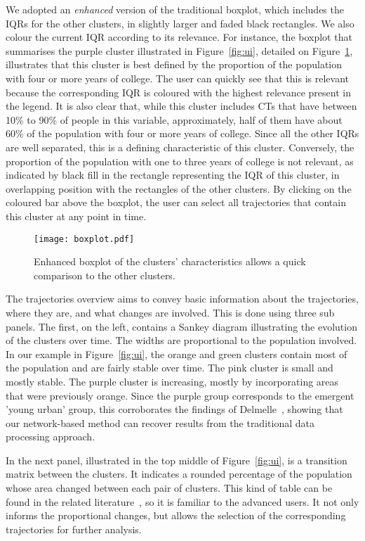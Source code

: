 We adopted an \emph{enhanced} version of the traditional boxplot, which includes
the IQRs for the other clusters, in slightly larger and faded black rectangles.
We also colour the current IQR according to its relevance.  For instance, the
boxplot that summarises the purple cluster illustrated in Figure~\ref{fig:ui},
detailed on Figure~\ref{fig:boxplot}, illustrates that this cluster is best
defined by the proportion of the population with four or more years of college.
The user can quickly see that this is relevant because the corresponding IQR is
coloured with the highest relevance present in the legend. It is also clear
that, while this cluster includes CTs that have between 10\% to 90\% of people
in this variable, approximately, half of them have about 60\% of the population
with four or more years of college. Since all the other IQRs are well separated,
this is a defining characteristic of this cluster. Conversely, the proportion of
the population with one to three years of college is not relevant, as indicated
by black fill in the rectangle representing the IQR of this cluster, in
overlapping position with the rectangles of the other clusters. By clicking on
the coloured bar above the boxplot, the user can select all trajectories that
contain this cluster at any point in time.

\begin{figure}
    \centering 
    \texttt{[image: boxplot.pdf]}
    \caption{Enhanced boxplot of the clusters' characteristics allows a quick
    comparison to the other clusters.\label{fig:boxplot}}
\end{figure}


The trajectories overview aims to convey basic information about the
trajectories, where they are, and what changes are involved. This is done using
three sub panels. The first, on the left, contains a Sankey diagram illustrating
the evolution of the clusters over time. The widths are proportional to the
population involved. In our example in Figure~\ref{fig:ui}, the orange and green
clusters contain most of the population and are fairly stable over time. The
pink cluster is small and mostly stable. The purple cluster is increasing,
mostly by incorporating areas that were previously orange. Since the purple
group corresponds to the emergent 'young urban' group, this corroborates the
findings of Delmelle~\citep{Delmelle2016,Delmelle2017}, showing that our
network-based method can recover results from the traditional data processing
approach.

In the next panel, illustrated in the top middle of Figure~\ref{fig:ui}, is a
transition matrix between the clusters. It indicates a rounded percentage of the
population whose area changed between each pair of clusters. This kind of table
can be found in the related literature~\citep{Delmelle2016}, so it is familiar
to the advanced users. It not only informs the proportional changes, but allows
the selection of the corresponding trajectories for further analysis.

